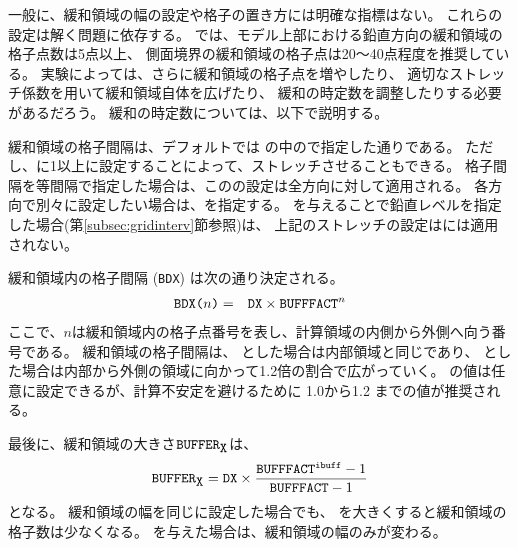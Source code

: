 一般に、緩和領域の幅の設定や格子の置き方には明確な指標はない。
これらの設定は解く問題に依存する。
\scalerm では、モデル上部における鉛直方向の緩和領域の格子点数は5点以上、
側面境界の緩和領域の格子点は20〜40点程度を推奨している。
実験によっては、さらに緩和領域の格子点を増やしたり、
適切なストレッチ係数を用いて緩和領域自体を広げたり、
緩和の時定数を調整したりする必要があるだろう。
緩和の時定数については、以下で説明する。


緩和領域の格子間隔は、デフォルトでは
の中ので指定した通りである。
ただし、に1以上に設定することによって、ストレッチさせることもできる。
格子間隔を等間隔で指定した場合は、このの設定は全方向に対して適用される。
各方向で別々に設定したい場合は、を指定する。
を与えることで鉛直レベルを指定した場合(第\ref{subsec:gridinterv}節参照)は、
上記のストレッチの設定は{\ZDIR}には適用されない。

緩和領域内の格子間隔 (\verb|BDX|) は次の通り決定される。
\begin{eqnarray}
 \verb|BDX(|n\verb|)| &=& \verb|DX| \times \verb|BUFFFACT|^n \nonumber
\end{eqnarray}
ここで、$n$は緩和領域内の格子点番号を表し、計算領域の内側から外側へ向う番号である。
緩和領域の格子間隔は、
とした場合は内部領域と同じであり、
とした場合は内部から外側の領域に向かって1.2倍の割合で広がっていく。
の値は任意に設定できるが、計算不安定を避けるために 1.0から1.2 までの値が推奨される。

最後に、緩和領域の大きさ$\verb|BUFFER|_{\verb|X|}$は、
\[
  \verb|BUFFER|_{\verb|X|} = \nmitemeq{DX} \times \frac{ \nmitemeq{BUFFFACT}^{\texttt{\detokenize{ibuff}}}-1}{ \nmitemeq{BUFFFACT}-1 }
\]
となる。
%
緩和領域の幅を同じに設定した場合でも、
を大きくすると緩和領域の格子数は少なくなる。
を与えた場合は、緩和領域の幅のみが変わる。

